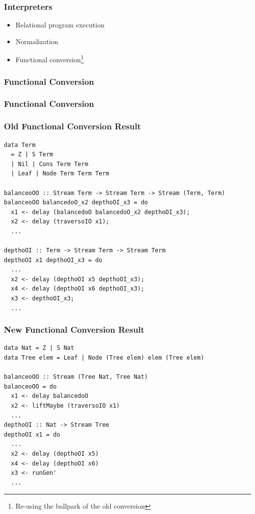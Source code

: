\documentclass[xcolor={dvipsnames}, aspectratio=169]{beamer}
\begin{document}
\begin{frame}[fragile]
  \frametitle{Interpreters}
  \begin{itemize}
    \item Relational program execution 
    \item Normalization
    \item Functional conversion\footnote{Re-using the ballpark of the old conversion}
  \end{itemize}
\end{frame}

\begin{frame}[fragile]
  \frametitle{Functional Conversion}
 
\end{frame}

\addtocounter{framenumber}{-1}

\begin{frame}[fragile]
  \frametitle{Functional Conversion}
 
\end{frame}



\begin{frame}[fragile]
  \frametitle{Old Functional Conversion Result}
\begin{lstlisting}[language=ocanren1,basicstyle=\footnotesize]
data Term
  = Z | S Term
  | Nil | Cons Term Term
  | Leaf | Node Term Term Term

balanceoOO :: Stream Term -> Stream Term -> Stream (Term, Term)
balanceoOO balancedoO_x2 depthoOI_x3 = do
  x1 <- delay (balancedoO balancedoO_x2 depthoOI_x3);
  x2 <- delay (traversoIO x1);
  ...

depthoOI :: Term -> Stream Term -> Stream Term
depthoOI x1 depthoOI_x3 = do
  ...
  x2 <- delay (depthoOI x5 depthoOI_x3);
  x4 <- delay (depthoOI x6 depthoOI_x3);
  x3 <- depthoOI_x3;
  ...
\end{lstlisting}
\end{frame}

\begin{frame}[fragile]
  \frametitle{New Functional Conversion Result}
\begin{lstlisting}[language=ocanren1, basicstyle=\footnotesize]
data Nat = Z | S Nat
data Tree elem = Leaf | Node (Tree elem) elem (Tree elem)

balanceoOO :: Stream (Tree Nat, Tree Nat)
balanceoOO = do
  x1 <- delay balancedoO
  x2 <- liftMaybe (traversoIO x1)
  ...
depthoOI :: Nat -> Stream Tree
depthoOI x1 = do
  ...
  x2 <- delay (depthoOI x5)
  x4 <- delay (depthoOI x6)
  x3 <- runGen'
  ...
\end{lstlisting}
\end{frame}
\end{document}
